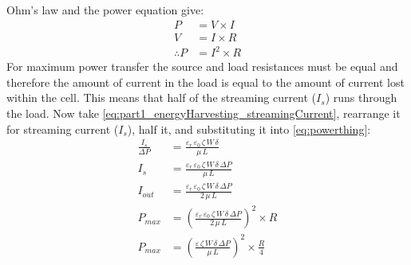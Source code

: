       Ohm's law and the power equation give:
      \begin{align}
        P &= V \times I\nonumber\\
        V &= I \times R\nonumber\\
        \label{eq:powerthing}\therefore P &= I^{2}\times R
      \end{align}
      For maximum power transfer the source and load resistances must be equal and therefore the amount of current in the load is equal to the amount of current lost within the cell.
      This means that half of the streaming current ($I_{s}$) runs through the load.
      Now take \cref{eq:part1_energyHarvesting_streamingCurrent}, rearrange it for streaming current ($I_{s}$), half it, and substituting it into \cref{eq:powerthing}:
      \begin{align}
        \frac{I_{s}}{\Delta P} &= \frac{\varepsilon_{r}\,\varepsilon_{0}\,\zeta\,W\,\delta}{\mu\,L}\nonumber\\
        I_{s} &= \frac{\varepsilon_{r}\,\varepsilon_{0}\,\zeta\,W\,\delta\,\Delta P}{\mu\,L}\nonumber\\
        I_{out} &= \frac{\varepsilon_{r}\,\varepsilon_{0}\,\zeta\,W\,\delta\,\Delta P}{2\,\mu\,L}\nonumber\\
        P_{max} &= \left(\frac{\varepsilon_{r}\,\varepsilon_{0}\,\zeta\,W\,\delta\,\Delta P}{2\,\mu\,L}\right)^{2}\times R\nonumber\\
        \label{eq:streamingCell_maxPower_substituted}P_{max} &= \left(\frac{\varepsilon\,\zeta\,W\,\delta\,\Delta P}{\mu\,L}\right)^{2}\times \frac{R}{4}\nonumber\\
      \end{align}



